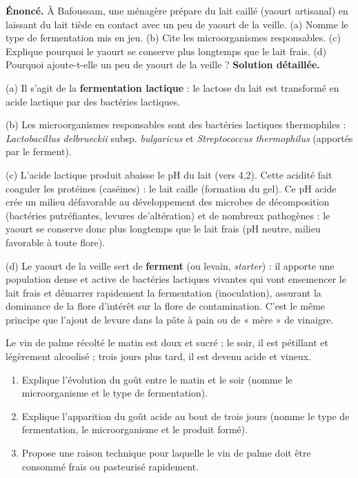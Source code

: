 \documentclass[11pt]{article}
\begin{document}
\begin{exoresolu}
\textbf{Énoncé.} À Bafoussam, une ménagère prépare du lait caillé (yaourt artisanal) en laissant du lait tiède en contact avec un peu de yaourt de la veille. (a) Nomme le type de fermentation mis en jeu. (b) Cite les microorganismes responsables. (c) Explique pourquoi le yaourt se conserve plus longtemps que le lait frais. (d) Pourquoi ajoute-t-elle un peu de yaourt de la veille ?
\tcblower
\textbf{Solution détaillée.}

(a) Il s'agit de la \textbf{fermentation lactique} : le lactose du lait est transformé en acide lactique par des bactéries lactiques.

(b) Les microorganismes responsables sont des bactéries lactiques thermophiles : \emph{Lactobacillus delbrueckii} subsp. \emph{bulgaricus} et \emph{Streptococcus thermophilus} (apportés par le ferment).

(c) L'acide lactique produit abaisse le pH du lait (vers 4,2). Cette acidité fait coaguler les protéines (caséines) : le lait caille (formation du gel). Ce pH acide crée un milieu défavorable au développement des microbes de décomposition (bactéries putréfiantes, levures de'altération) et de nombreux pathogènes : le yaourt se conserve donc plus longtemps que le lait frais (pH neutre, milieu favorable à toute flore).

(d) Le yaourt de la veille sert de \textbf{ferment} (ou levain, \emph{starter}) : il apporte une population dense et active de bactéries lactiques vivantes qui vont ensemencer le lait frais et démarrer rapidement la fermentation (inoculation), assurant la dominance de la flore d'intérêt sur la flore de contamination. C'est le même principe que l'ajout de levure dans la pâte à pain ou de « mère » de vinaigre.
\end{exoresolu}

\begin{exercice}
Le vin de palme récolté le matin est doux et sucré ; le soir, il est pétillant et légèrement alcoolisé ; trois jours plus tard, il est devenu acide et vineux.
\begin{enumerate}
\item Explique l'évolution du goût entre le matin et le soir (nomme le microorganisme et le type de fermentation).
\item Explique l'apparition du goût acide au bout de trois jours (nomme le type de fermentation, le microorganisme et le produit formé).
\item Propose une raison technique pour laquelle le vin de palme doit être consommé frais ou pasteurisé rapidement.
\end{enumerate}
\end{exercice}
\end{document}

